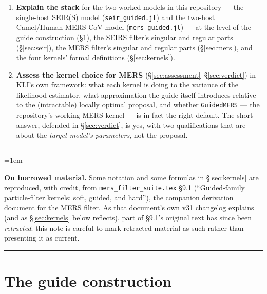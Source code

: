 \documentclass[11pt]{article}
\theoremstyle{plain}
\newenvironment{notebox}{%
  \par\addvspace{8pt}\noindent%
  {\color{chline}\rule{\linewidth}{0.8pt}}\par\smallskip%
  \begingroup\color{chline!40!black}%
  \leftskip=1em\relax
}{%
  \par\endgroup\smallskip%
  {\color{chline}\rule{\linewidth}{0.8pt}}\par\addvspace{8pt}%
}
\begin{document}
\begin{enumerate}
\item \textbf{Explain the stack} for the two worked models in this repository --- the single-host
SEIR(S) model (\texttt{seir\_guided.jl}) and the two-host Camel/Human MERS-CoV model
(\texttt{mers\_guided.jl}) --- at the level of the guide construction (\S\ref{sec:guide}), the
SEIRS filter's singular and regular parts (\S\ref{sec:seir}), the MERS filter's singular and
regular parts (\S\ref{sec:mers}), and the four kernels' formal definitions
(\S\ref{sec:kernels}).
\item \textbf{Assess the kernel choice for MERS} (\S\ref{sec:assessment}--\S\ref{sec:verdict}) in
KLI's own framework: what each kernel is doing to the variance of the likelihood estimator, what
approximation the guide itself introduces relative to the (intractable) locally optimal proposal,
and whether \texttt{GuidedMERS} --- the repository's working MERS kernel --- is in fact the right
default. The short answer, defended in \S\ref{sec:verdict}, is yes, with two qualifications that
are about the \emph{target model's parameters}, not the proposal.
\end{enumerate}

\begin{notebox}
\textbf{On borrowed material.} Some notation and some formulas in \S\ref{sec:kernels} are
reproduced, with credit, from \texttt{mers\_filter\_suite.tex} \S9.1 (``Guided-family
particle-filter kernels: soft, guided, and hard''), the companion derivation document for the MERS
filter. As that document's own v31 changelog explains (and as \S\ref{sec:kernels} below reflects),
part of \S9.1's original text has since been \emph{retracted}: this note is careful to mark
retracted material as such rather than presenting it as current.
\end{notebox}

\section{The guide construction}
\label{sec:guide}
\end{document}
